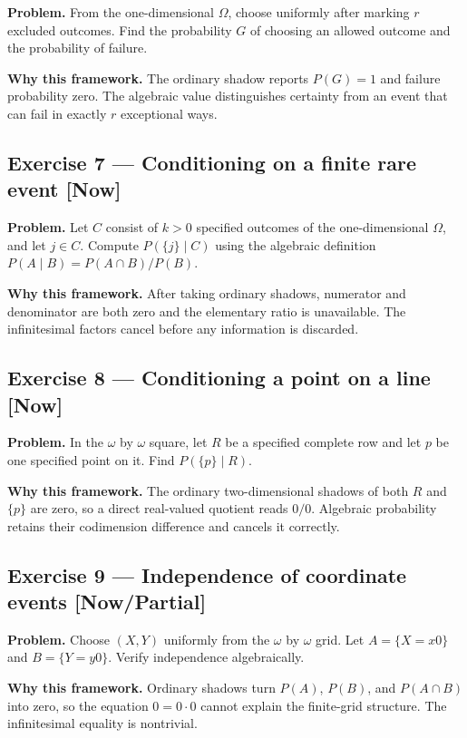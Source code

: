 \documentclass[11pt]{article}
\begin{document}
\textbf{Problem.} From the one-dimensional $\Omega$, choose uniformly after marking
$r$ excluded outcomes. Find the probability $G$ of choosing an allowed
outcome and the probability of failure.

\textbf{Why this framework.} The ordinary shadow reports $P(G)=1$ and failure
probability zero. The algebraic value distinguishes certainty from an event
that can fail in exactly $r$ exceptional ways.


\subsection*{Exercise 7 --- Conditioning on a finite rare event \hfill \normalfont\small[Now]}

\textbf{Problem.} Let $C$ consist of $k > 0$ specified outcomes of the
one-dimensional $\Omega$, and let $j\in C$. Compute $P(\{j\}\mid C)$ using the
algebraic definition $P(A\mid B) = P(A\cap B)/P(B)$.

\textbf{Why this framework.} After taking ordinary shadows, numerator and
denominator are both zero and the elementary ratio is unavailable. The
infinitesimal factors cancel before any information is discarded.


\subsection*{Exercise 8 --- Conditioning a point on a line \hfill \normalfont\small[Now]}

\textbf{Problem.} In the $\omega$ by $\omega$ square, let $R$ be a specified complete
row and let $p$ be one specified point on it. Find $P(\{p\}\mid R)$.

\textbf{Why this framework.} The ordinary two-dimensional shadows of both $R$ and
$\{p\}$ are zero, so a direct real-valued quotient reads $0/0$. Algebraic
probability retains their codimension difference and cancels it correctly.


\subsection*{Exercise 9 --- Independence of coordinate events \hfill \normalfont\small[Now/Partial]}

\textbf{Problem.} Choose $(X,Y)$ uniformly from the $\omega$ by $\omega$ grid. Let
$A = \{X=x0\}$ and $B = \{Y=y0\}$. Verify independence algebraically.

\textbf{Why this framework.} Ordinary shadows turn $P(A)$, $P(B)$, and
$P(A\cap B)$ into zero, so the equation $0 = 0\cdot 0$ cannot explain the
finite-grid structure. The infinitesimal equality is nontrivial.
\end{document}
